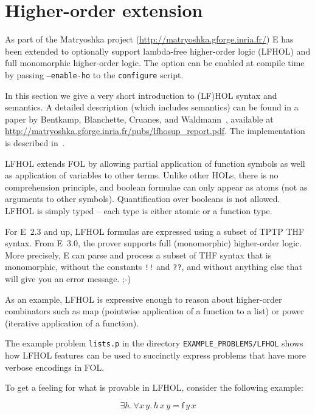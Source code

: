 \documentclass{report}
\begin{document}
\section{Higher-order extension}

As part of the Matryoshka project
(\url{http://matryoshka.gforge.inria.fr/}) E has been extended to
optionally support lambda-free higher-order logic (LFHOL) and full
monomorphic higher-order logic. The option can be enabled at compile
time by passing \texttt{--enable-ho} to the \texttt{configure} script.

In this section we give a very short introduction to (LF)HOL syntax
and semantics. A detailed description (which includes semantics) can be
found in a paper by Bentkamp, Blanchette, Cruanes, and
Waldmann~\cite{BBCW:IJCAR-2018}, available at
\url{http://matryoshka.gforge.inria.fr/pubs/lfhosup_report.pdf}. The
implementation is described
in~\cite{VBCS:TACAS-2019,VBCS:LFHOReport-2018}.

LFHOL extends FOL by allowing partial application of function symbols
as well as application of variables to other terms. Unlike other HOLs,
there is no comprehension principle, and boolean formulae can only
appear as atoms (not as arguments to other symbols). Quantification
over booleans is not allowed. LFHOL is simply typed -- each type is
either atomic or a function type.

For E~2.3 and up, LFHOL formulas are expressed using a subset of TPTP
THF syntax. From E~3.0, the prover supports full (monomorphic)
higher-order logic. More precisely, E can parse and process a subset
of THF syntax that is monomorphic, without the constants \texttt{!!}
and \texttt{??}, and without anything else that will give you an error
message. ;-)

As an example, LFHOL is expressive enough to reason about higher-order
combinators such as \textsf{map} (pointwise application of a function
to a list) or \textsf{power} (iterative application of a function).

The example problem \texttt{lists.p} in the directory
\texttt{EXAMPLE\_PROBLEMS/LFHOL} shows how LFHOL features can be used
to succinctly express problems that have more verbose encodings in FOL.

To get a feeling for what is provable in LFHOL, consider the following
example:

$$  \exists h.\, \forall x \, y. \, h \, x \, y = \textsf{f}  \, y \, x $$
\end{document}
